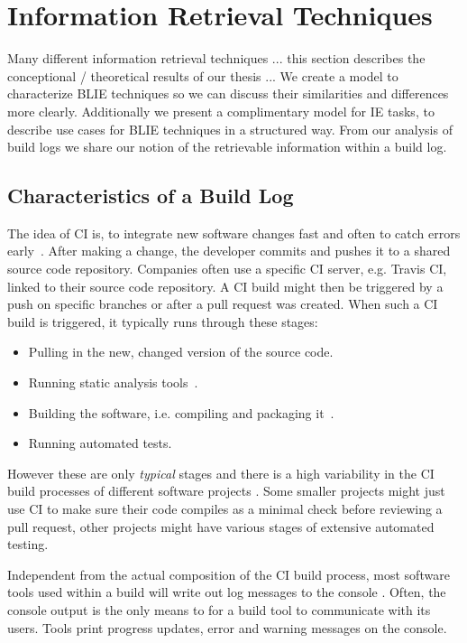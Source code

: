 \documentclass[\myrootdir/main.tex]{subfiles}
\begin{document}
\chapter{Information Retrieval Techniques}
\label{sec:models}
Many different information retrieval techniques ... this section describes the conceptional / theoretical results of our thesis ...
We create a model to characterize BLIE techniques so we can discuss their similarities and differences more clearly.
Additionally we present a complimentary model for IE tasks, to describe use cases for BLIE techniques in a structured way.
From our analysis of build logs we share our notion of the retrievable information within a build log.

\section{Characteristics of a Build Log}
The idea of CI is, to integrate new software changes fast and often to catch errors early~\cite{humble2010continuous}. After making a change, the developer commits and pushes it to a shared source code repository. Companies often use a specific CI server, e.g. Travis CI, linked to their source code repository. A CI build might then be triggered by a push on specific branches or after a pull request was created. When such a CI build is triggered, it typically runs through these stages:
\begin{itemize}
	\item Pulling in the new, changed version of the source code.
	\item Running static analysis tools~\cite{zampetti2017open}.
	\item Building the software, i.e. compiling and packaging it~\cite{phillips2014understanding}.
	\item Running automated tests.
\end{itemize}
However these are only \emph{typical} stages and there is a high variability in the CI build processes of different software projects . Some smaller projects might just use CI to make sure their code compiles as a minimal check before reviewing a pull request, other projects might have various stages of extensive automated testing.

Independent from the actual composition of the CI build process, most software tools used within a build will write out log messages to the console . Often, the console output is the only means to for a build tool to communicate with its users. Tools print progress updates, error and warning messages on the console.
\end{document}

